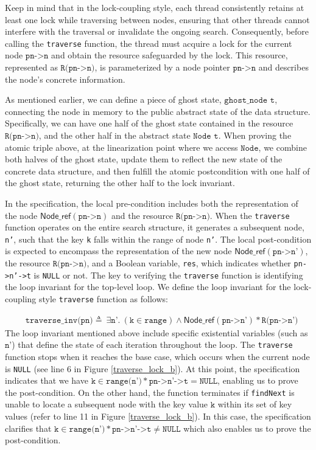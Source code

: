 \documentclass[a4paper,UKenglish,cleveref, autoref, thm-restate]{lipics-v2021}
\newcommand{\nodeboxrep}{\ensuremath{\mathsf{Node\_ref}}}
\begin{document}
Keep in mind that in the lock-coupling style, each thread consistently retains at least one lock while traversing between nodes, ensuring that other threads cannot interfere with the traversal or invalidate the ongoing search. Consequently, before calling the \texttt{traverse} function, the thread must acquire a lock for the current node $\texttt{pn->n}$ and obtain the resource safeguarded by the lock. This resource, represented as $\texttt{R(pn->n)}$, is parameterized by a node pointer $\texttt{pn->n}$ and describes the node's concrete information.

As mentioned earlier, we can define a piece of ghost state, $\texttt{ghost\_node t}$, connecting the node in memory to the public abstract state of the data structure. Specifically, we can have one half of the ghost state contained in the resource $\texttt{R(pn->n)}$, and the other half in the abstract state $\texttt{Node t}$. When proving the atomic triple above, at the linearization point where we access $\texttt{Node}$, we combine both halves of the ghost state, update them to reflect the new state of the concrete data structure, and then fulfill the atomic postcondition with one half of the ghost state, returning the other half to the lock invariant.

In the specification, the local pre-condition includes both the representation of the node $\nodeboxrep(\texttt{pn->n})$ and the resource $\texttt{R(pn->n)}$. When the \texttt{traverse} function operates on the entire search structure, it generates a subsequent node, \texttt{n'}, such that the key \texttt{k} falls within the range of node \texttt{n'}. The local post-condition is expected to encompass the representation of the new node $\nodeboxrep(\texttt{pn->n'})$, the resource $\texttt{R(pn->n)}$, and a Boolean variable, \texttt{res}, which indicates whether \texttt{pn->n'->t} is \texttt{NULL} or not. The key to verifying the \texttt{traverse} function is identifying the loop invariant for the top-level loop. We define the loop invariant for the lock-coupling style \texttt{traverse} function as follows:

\begin{align*} &\texttt{traverse\_inv(pn)} \triangleq\ \exists \texttt{n'}.\ (\texttt{k} \in \texttt{range})\land \nodeboxrep(\texttt{pn->n'})  \ast  \texttt{R(pn->n')}   
\end{align*}
The loop invariant mentioned above include specific existential variables (such as $\texttt{n'}$) that define the state of each iteration throughout the loop. The \lstinline{traverse} function stops when it reaches the base case, which occurs when the current node is \lstinline{NULL} (see line 6 in Figure \ref{traverse_lock_b}). At this point, the specification indicates that we have $\texttt{k} \in \texttt{range(n')} \ast \texttt{pn->n'->t} = \texttt{NULL}$, enabling us to prove the post-condition. On the other hand, the function terminates if \lstinline{findNext} is unable to locate a subsequent node with the key value  $\texttt{k}$ within its set of key values (refer to line 11 in Figure \ref{traverse_lock_b}). In this case, the specification clarifies that $\texttt{k} \in \texttt{range(n')} \ast \texttt{pn->n'->t} \neq \texttt{NULL}$ which also enables us to prove the post-condition. 
\end{document}
